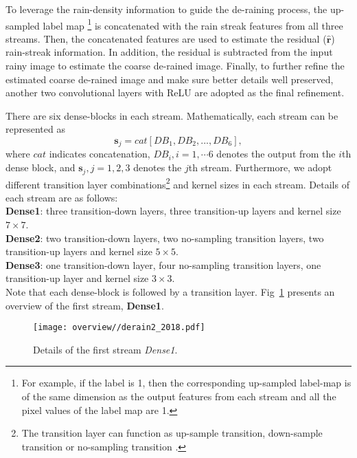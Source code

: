\documentclass[10pt,twocolumn,letterpaper]{article}
\begin{document}
To leverage the rain-density information to guide the de-raining process,  the up-sampled label map \footnote{For example, if the label is 1, then the corresponding up-sampled label-map is of the same dimension as the output features from each stream and all the pixel values of  the label map are 1.} is concatenated with the rain streak features from all three streams. Then, the concatenated features are used to estimate the residual ($\mathbf{\hat{r}}$) rain-streak information. In addition, the residual is subtracted from the input rainy image to estimate the coarse de-rained image. Finally, to further refine the estimated coarse de-rained image and make sure better details well preserved, another two convolutional layers with ReLU are adopted as the final refinement.   


 
There are six dense-blocks in  each stream. Mathematically, each stream can be represented as
\begin{equation}\label{eq:single_stream}
\mathbf{s}_j={cat}[DB_1, DB_2,..., DB_6],
\end{equation}
where $cat$ indicates concatenation, $DB_i, i=1, \cdots 6$ denotes the output from the $i$th dense block, and $\mathbf{s}_j, j=1, 2, 3$ denotes the $j$th stream. Furthermore, we adopt different transition layer combinations\footnote{The transition layer can function as up-sample transition, down-sample transition or no-sampling transition \cite{dense_fully}.} and kernel sizes in each stream.  Details of each stream are as follows:\\
 \noindent \textbf{Dense1}: three transition-down layers, three transition-up layers and kernel size $7\times7$.\\ 
 \noindent \textbf{Dense2}: two transition-down layers, two no-sampling transition layers, two transition-up layers and kernel size $5\times5$.\\
 \noindent \textbf{Dense3}: one transition-down layer, four no-sampling transition layers, one transition-up layer and kernel size $3\times3$.\\
 Note that each dense-block is followed by a transition layer.   Fig~\ref{fig:multi_column} presents an overview of the first stream, \textbf{Dense1}.\\
 
  \begin{figure}[htp!]
 	\centering
 	\begin{minipage}{0.45\textwidth}
 		\texttt{[image: overview//derain2\_2018.pdf]}
 		\captionsetup{labelformat=empty}
 		\captionsetup{justification=centering}
 	\end{minipage}
 	\vskip-10pt
 	\caption{Details of the first stream \emph{Dense1}.} 
 	\label{fig:multi_column}
 \end{figure}
\end{document}

